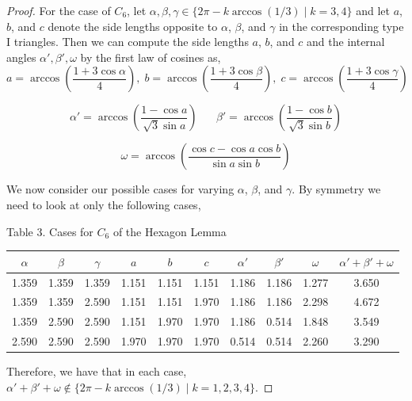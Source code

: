 \documentclass[10pt]{article}
\numberwithin{Subcase}{Case}
\begin{document}
\begin{proof}
For the case of $C_6$, let $\alpha, \beta, \gamma \in \{2\pi-k\arccos(1/3) \; | \; k=3,4\}$ and let $a$, $b$, and $c$ denote the side lengths opposite to $\alpha$, $\beta$, and $\gamma$ in the corresponding type I triangles. Then we can compute the side lengths $a$, $b$, and $c$ and the internal angles $\alpha',\beta',\omega$ by the first law of cosines as,
\begin{equation*}
a = \arccos\left(\frac{1+3\cos\alpha}{4}\right),\; b = \arccos\left(\frac{1+3\cos\beta}{4}\right),\; c = \arccos\left(\frac{1+3\cos\gamma}{4}\right)
\end{equation*}

\begin{equation*}
\alpha'=\arccos\left(\frac{1-\cos a}{\sqrt{3}\sin a}\right) \;\;\;\;\;\;
\beta'=\arccos\left(\frac{1-\cos b}{\sqrt{3}\sin b}\right)
\end{equation*}

\begin{equation*}
\omega = \arccos\left(\frac{\cos c-\cos a\cos b}{\sin a\sin b}\right)
\end{equation*}

We now consider our possible cases for varying $\alpha$, $\beta$, and $\gamma$. By symmetry we need to look at only the following cases,
\begin{center}
Table 3. Cases for $C_6$ of the Hexagon Lemma
\begin{tabular}{| c | c | c | c | c | c | c | c | c | c |} 
\hline
$\alpha$ & $\beta$ & $\gamma$ & $a$ & $b$ & $c$ & $\alpha'$ & $\beta'$ & $\omega$ & $\alpha' + \beta' + \omega$ \\ \hline
1.359 & 1.359 & 1.359 & 1.151 & 1.151 & 1.151 & 1.186 & 1.186 & 1.277 & 3.650 \\ \hline
1.359 & 1.359 & 2.590 & 1.151 & 1.151 & 1.970 & 1.186 & 1.186 & 2.298 & 4.672 \\ \hline
1.359 & 2.590 & 2.590 & 1.151 & 1.970 & 1.970 & 1.186 & 0.514 & 1.848 & 3.549 \\ \hline
2.590 & 2.590 & 2.590 & 1.970 & 1.970 & 1.970 & 0.514 & 0.514 & 2.260 & 3.290 \\ \hline
\end{tabular}
\end{center}
Therefore, we have that in each case,
$\alpha' + \beta' + \omega \notin \{2\pi - k\arccos(1/3) \; | \; k=1,2,3,4\}$.


\end{proof}
\end{document}

